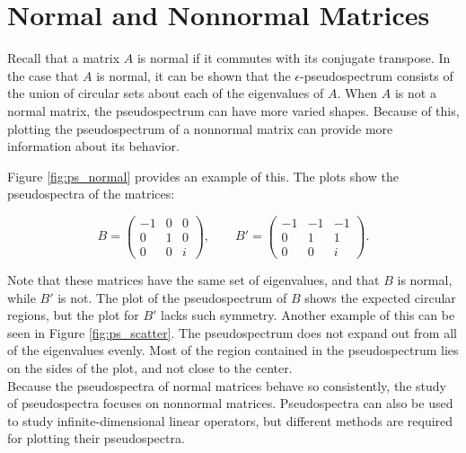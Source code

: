 \section*{Normal and Nonnormal Matrices}
Recall that a matrix $A$ is normal if it commutes with its conjugate transpose. In the case that $A$ is normal, it can be shown that the $\epsilon$-pseudospectrum consists of the union of circular sets about each of the eigenvalues of $A$. When $A$ is not a normal matrix, the pseudospectrum can have more varied shapes. Because of this, plotting the pseudospectrum of a nonnormal matrix can provide more information about its behavior.

Figure \ref{fig:ps_normal} provides an example of this. The plots show the pseudospectra of the matrices:

\begin{equation}
	B = \begin{pmatrix}
		-1 & 0 & 0\\
		0 & 1 & 0\\
		0 & 0 & i
	\end{pmatrix}, \qquad 	B' = \begin{pmatrix}
		-1 & -1 & -1\\
		0 & 1 & 1\\
		0 & 0 & i
	\end{pmatrix}.
\end{equation}

Note that these matrices have the same set of eigenvalues, and that $B$ is normal, while $B'$ is not. The plot of the pseudospectrum of $B$ shows the expected circular regions, but the plot for $B'$ lacks such symmetry. Another example of this can be seen in Figure \ref{fig:ps_scatter}. The pseudospectrum does not expand out from all of the eigenvalues evenly. Most of the region contained in the pseudospectrum lies on the sides of the plot, and not close to the center.\\

Because the pseudospectra of normal matrices behave so consistently, the study of pseudospectra focuses on nonnormal matrices. Pseudospectra can also be used to study infinite-dimensional linear operators, but different methods are required for plotting their pseudospectra.

